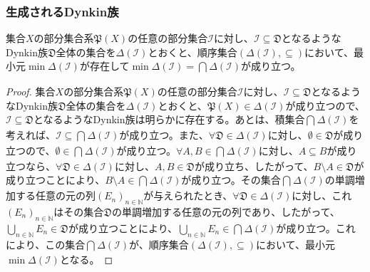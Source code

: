 \documentclass[dvipdfmx]{jsarticle}
\begin{document}
\subsubsection{生成されるDynkin族}%
\begin{thm}\label{4.5.6.11}
集合$X$の部分集合系$\mathfrak{P}(X)$の任意の部分集合$\mathcal{I}$に対し、$\mathcal{I \subseteq}\mathfrak{D}$となるようなDynkin族$\mathfrak{D}$全体の集合を$\varDelta\left( \mathcal{I} \right)$とおくと、順序集合$\left( \varDelta\left( \mathcal{I} \right), \subseteq \right)$において、最小元$\min{\varDelta\left( \mathcal{I} \right)}$が存在して$\min{\varDelta\left( \mathcal{I} \right)} = \bigcap_{} {\varDelta\left( \mathcal{I} \right)}$が成り立つ。
\end{thm}
\begin{proof}
集合$X$の部分集合系$\mathfrak{P}(X)$の任意の部分集合$\mathcal{I}$に対し、$\mathcal{I \subseteq}\mathfrak{D}$となるようなDynkin族$\mathfrak{D}$全体の集合を$\varDelta\left( \mathcal{I} \right)$とおくと、$\mathfrak{P}(X) \in \varDelta\left( \mathcal{I} \right)$が成り立つので、$\mathcal{I \subseteq}\mathfrak{D}$となるようなDynkin族は明らかに存在する。あとは、積集合$\bigcap_{} {\varDelta\left( \mathcal{I} \right)}$を考えれば、$\mathcal{I \subseteq}\bigcap_{} {\varDelta\left( \mathcal{I} \right)}$が成り立つ。また、$\mathfrak{\forall D \in}\varDelta\left( \mathcal{I} \right)$に対し、$\mathfrak{\emptyset \in D}$が成り立つので、$\emptyset \in \bigcap_{} {\varDelta\left( \mathcal{I} \right)}$が成り立つ。$\forall A,B \in \bigcap_{} {\varDelta\left( \mathcal{I} \right)}$に対し、$A \subseteq B$が成り立つなら、$\mathfrak{\forall D \in}\varDelta\left( \mathcal{I} \right)$に対し、$A,B\in \mathfrak{D}$が成り立ち、したがって、$B \setminus A\in \mathfrak{D}$が成り立つことにより、$B \setminus A \in \bigcap_{} {\varDelta\left( \mathcal{I} \right)}$が成り立つ。その集合$\bigcap_{} {\varDelta\left( \mathcal{I} \right)}$の単調増加する任意の元の列$\left( E_{n} \right)_{n \in \mathbb{N}}$が与えられたとき、$\mathfrak{\forall D \in}\varDelta\left( \mathcal{I} \right)$に対し、これ$\left( E_{n} \right)_{n \in \mathbb{N}}$はその集合$\mathfrak{D}$の単調増加する任意の元の列であり、したがって、$\bigcup_{n \in \mathbb{N}} E_{n}\in \mathfrak{D}$が成り立つことにより、$\bigcup_{n \in \mathbb{N}} E_{n} \in \bigcap_{} {\varDelta\left( \mathcal{I} \right)}$が成り立つ。これにより、この集合$\bigcap_{} {\varDelta\left( \mathcal{I} \right)}$が、順序集合$\left( \varDelta\left( \mathcal{I} \right), \subseteq \right)$において、最小元$\min{\varDelta\left( \mathcal{I} \right)}$となる。
\end{proof}
\end{document}
